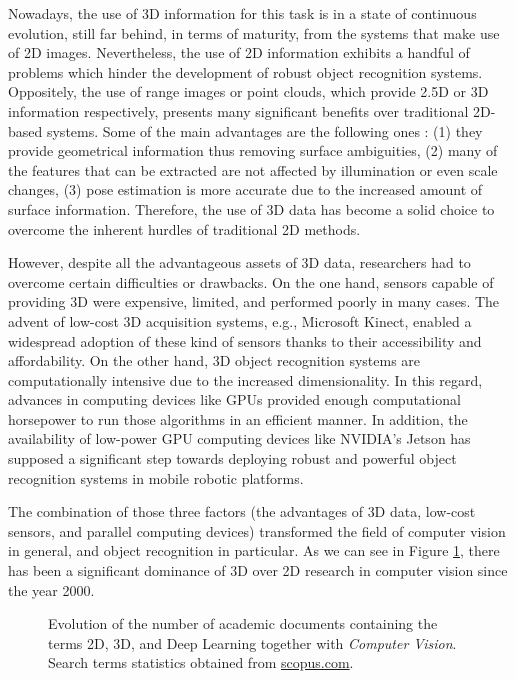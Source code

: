 Nowadays, the use of \acs{3D} information for this task is in a state of continuous evolution, still far behind, in terms of maturity, from the systems that make use of \acs{2D} images. Nevertheless, the use of \acs{2D} information exhibits a handful of problems which hinder the development of robust object recognition systems. Oppositely, the use of range images or point clouds, which provide \acs{2.5D} or \acs{3D} information respectively, presents many significant benefits over traditional \acs{2D}-based systems. Some of the main advantages are the following ones \cite{Guo2014}: (1) they provide geometrical information thus removing surface ambiguities, (2) many of the features that can be extracted are not affected by illumination or even scale changes, (3) pose estimation is more accurate due to the increased amount of surface information. Therefore, the use of \acs{3D} data has become a solid choice to overcome the inherent hurdles of traditional \acs{2D} methods.

However, despite all the advantageous assets of \acs{3D} data, researchers had to overcome certain difficulties or drawbacks. On the one hand, sensors capable of providing \acs{3D} were expensive, limited, and performed poorly in many cases. The advent of low-cost \acs{3D} acquisition systems, e.g., Microsoft Kinect, enabled a widespread adoption of these kind of sensors thanks to their accessibility and affordability. On the other hand, \acs{3D} object recognition systems are computationally intensive due to the increased dimensionality. In this regard, advances in computing devices like \acp{GPU} provided enough computational horsepower to run those algorithms in an efficient manner. In addition, the availability of low-power \acs{GPU} computing devices like NVIDIA's Jetson has supposed a significant step towards deploying robust and powerful object recognition systems in mobile robotic platforms.

The combination of those three factors (the advantages of \acs{3D} data, low-cost sensors, and parallel computing devices) transformed the field of computer vision in general, and object recognition in particular. As we can see in Figure \ref{fig:terms_statistics}, there has been a significant dominance of \acs{3D} over \acs{2D} research in computer vision since the year 2000.

\begin{figure}[!b]
	
	\caption{Evolution of the number of academic documents containing the terms 2D, 3D, and Deep Learning together with \emph{Computer Vision}. Search terms statistics obtained from \href{http://www.scopus.com/}{scopus.com}.}
	\label{fig:terms_statistics}
\end{figure}

